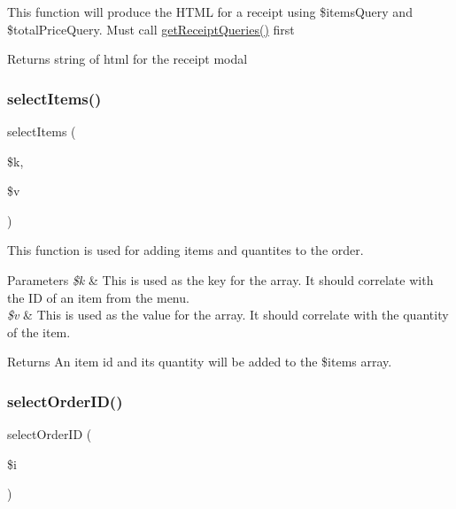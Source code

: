 This function will produce the H\+T\+ML for a receipt using \$items\+Query and \$total\+Price\+Query. Must call \mbox{\hyperlink{_catering___order___selection_8class_8php_afea91457e1886d995f1a6de7439ceaeb}{get\+Receipt\+Queries()}} first \begin{DoxyReturn}{Returns}
string of html for the receipt modal 
\end{DoxyReturn}
\mbox{\label{_catering___order___selection_8class_8php_ab30920ac61f282a414092277587a25a1}} 
\subsubsection{\texorpdfstring{selectItems()}{selectItems()}}
{\footnotesize\ttfamily select\+Items (\begin{DoxyParamCaption}\item[{}]{\$k,  }\item[{}]{\$v }\end{DoxyParamCaption})}

This function is used for adding items and quantites to the order. 
\begin{DoxyParams}{Parameters}
{\em \$k} & This is used as the key for the array. It should correlate with the ID of an item from the menu. \\
\hline
{\em \$v} & This is used as the value for the array. It should correlate with the quantity of the item. \\
\hline
\end{DoxyParams}
\begin{DoxyReturn}{Returns}
An item id and its quantity will be added to the \$items array. 
\end{DoxyReturn}
\mbox{\label{_catering___order___selection_8class_8php_ad8c931daea4616337e35d0add407efa0}} 
\subsubsection{\texorpdfstring{selectOrderID()}{selectOrderID()}}
{\footnotesize\ttfamily select\+Order\+ID (\begin{DoxyParamCaption}\item[{}]{\$i }\end{DoxyParamCaption})}


